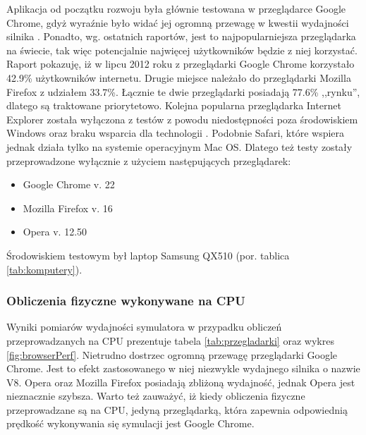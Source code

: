 Aplikacja od początku rozwoju była głównie testowana w przeglądarce Google
Chrome, gdyż wyraźnie było widać jej ogromną przewagę w kwestii wydajności
silnika . Ponadto, wg. ostatnich raportów, jest to
najpopularniejsza przeglądarka na świecie, tak więc potencjalnie najwięcej
użytkowników \en będzie z niej korzystać. Raport \cite{BrowserStats} pokazuję,
iż w lipcu 2012 roku z przeglądarki Google Chrome korzystało 42.9\% użytkowników
internetu. Drugie miejsce należało do przeglądarki Mozilla Firefox z udziałem
33.7\%. Łącznie te dwie przeglądarki posiadają 77.6\% ,,rynku'', dlatego są
traktowane priorytetowo. Kolejna popularna przeglądarka Internet Explorer
została wyłączona z testów z powodu niedostępności poza środowiskiem Windows
oraz braku wsparcia dla technologii . Podobnie Safari, które wspiera
 jednak działa tylko na systemie operacyjnym Mac OS. Dlatego też testy
zostały przeprowadzone wyłącznie z użyciem następujących przeglądarek:

\begin{itemize}
\item Google Chrome v. 22
\item Mozilla Firefox v. 16
\item Opera v. 12.50
\end{itemize}

Środowiskiem testowym był laptop Samsung QX510 (por. tablica \ref{tab:komputery}).

\subsubsection{Obliczenia fizyczne wykonywane na CPU}

Wyniki pomiarów wydajności symulatora w przypadku obliczeń przeprowadzanych na
CPU prezentuje tabela \ref{tab:przegladarki} oraz wykres \ref{fig:browserPerf}.
Nietrudno dostrzec ogromną przewagę przeglądarki Google Chrome. Jest to efekt
zastosowanego w niej niezwykle wydajnego silnika  o nazwie V8.
Opera oraz Mozilla Firefox posiadają zbliżoną wydajność, jednak Opera jest
nieznacznie szybsza. Warto też zauważyć, iż kiedy obliczenia fizyczne
przeprowadzane są na CPU, jedyną przeglądarką, która zapewnia odpowiednią
prędkość wykonywania się symulacji jest Google Chrome.

